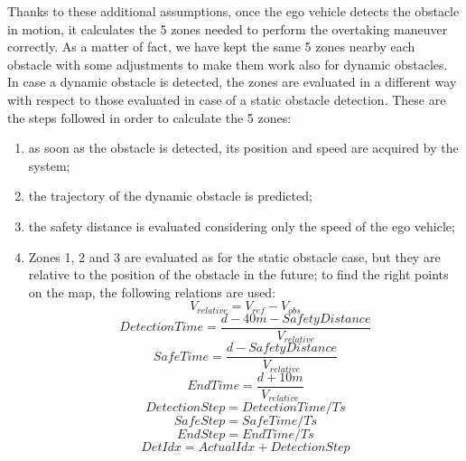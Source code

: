 Thanks to these additional assumptions, once the ego vehicle detects the obstacle in motion, it calculates the 5 zones needed to perform the overtaking maneuver correctly. As a matter of fact, we have kept the same 5 zones nearby each obstacle with some adjustments to make them work also for dynamic obstacles. 
In case a dynamic obstacle is detected, the zones are evaluated in a different way with respect to those evaluated in case of a static obstacle detection. These are the steps followed in order to calculate the 5 zones: 
\begin{enumerate}
    \item as soon as the obstacle is detected, its position and speed are acquired by the system;
    \item the trajectory of the dynamic obstacle is predicted;
    \item the safety distance is evaluated considering only the speed of the ego vehicle;
    \item Zones 1, 2 and 3 are evaluated as for the static obstacle case, but they are relative to the position of the obstacle in the future; to find the right points on the map, the following relations are used:
    \begin{equation}
        V_{relative} = V_{ref} - V_{obs}
    \end{equation}
    \begin{equation}
            DetectionTime = \frac{d-40m-SafetyDistance}{V_{relative}}
    \end{equation}
    \begin{equation}
            SafeTime = \frac{d-SafetyDistance}{V_{relative}}
    \end{equation}
    \begin{equation}
            EndTime = \frac{d+10m}{V_{relative}}
    \end{equation}
    \begin{equation}
            DetectionStep = DetectionTime/Ts
    \end{equation}
    \begin{equation}
            SafeStep = SafeTime/Ts
    \end{equation}
    \begin{equation}
            EndStep  = EndTime/Ts
    \end{equation}
    \begin{equation}
            DetIdx = ActualIdx+DetectionStep
    \end{equation}
    \begin{equation}

\end{equation}
\end{enumerate}
